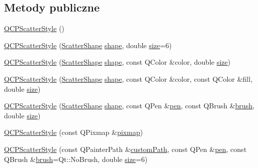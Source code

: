 \subsection*{Metody publiczne}
\begin{DoxyCompactItemize}
\item 
\hyperlink{class_q_c_p_scatter_style_a8836018d9ad83ccd8870de8315c1be73}{Q\+C\+P\+Scatter\+Style} ()
\item 
\hyperlink{class_q_c_p_scatter_style_a003d92f74f4561eda111862eadd62f28}{Q\+C\+P\+Scatter\+Style} (\hyperlink{class_q_c_p_scatter_style_adb31525af6b680e6f1b7472e43859349}{Scatter\+Shape} \hyperlink{class_q_c_p_scatter_style_a4462a25ef17769631f4e0aa81dadca4b}{shape}, double \hyperlink{class_q_c_p_scatter_style_a1973ee650368f1c5f55507b78473f634}{size}=6)
\item 
\hyperlink{class_q_c_p_scatter_style_afa059da858c864c7e05871dc602d7eab}{Q\+C\+P\+Scatter\+Style} (\hyperlink{class_q_c_p_scatter_style_adb31525af6b680e6f1b7472e43859349}{Scatter\+Shape} \hyperlink{class_q_c_p_scatter_style_a4462a25ef17769631f4e0aa81dadca4b}{shape}, const Q\+Color \&color, double \hyperlink{class_q_c_p_scatter_style_a1973ee650368f1c5f55507b78473f634}{size})
\item 
\hyperlink{class_q_c_p_scatter_style_a6e1b64f12cac7f07af180ae4316fd38d}{Q\+C\+P\+Scatter\+Style} (\hyperlink{class_q_c_p_scatter_style_adb31525af6b680e6f1b7472e43859349}{Scatter\+Shape} \hyperlink{class_q_c_p_scatter_style_a4462a25ef17769631f4e0aa81dadca4b}{shape}, const Q\+Color \&color, const Q\+Color \&fill, double \hyperlink{class_q_c_p_scatter_style_a1973ee650368f1c5f55507b78473f634}{size})
\item 
\hyperlink{class_q_c_p_scatter_style_a85acc4941d7e5c9bca5fa51377a77f49}{Q\+C\+P\+Scatter\+Style} (\hyperlink{class_q_c_p_scatter_style_adb31525af6b680e6f1b7472e43859349}{Scatter\+Shape} \hyperlink{class_q_c_p_scatter_style_a4462a25ef17769631f4e0aa81dadca4b}{shape}, const Q\+Pen \&\hyperlink{class_q_c_p_scatter_style_a3c24c3bf37b561b4807aed9f1418ab58}{pen}, const Q\+Brush \&\hyperlink{class_q_c_p_scatter_style_a46bf481d84bfa31b287dd43a3bf86d37}{brush}, double \hyperlink{class_q_c_p_scatter_style_a1973ee650368f1c5f55507b78473f634}{size})
\item 
\hyperlink{class_q_c_p_scatter_style_a63962094587a4c2258435aa7933996cc}{Q\+C\+P\+Scatter\+Style} (const Q\+Pixmap \&\hyperlink{class_q_c_p_scatter_style_a9bab44cc41fcd585621a4b3e0e48231b}{pixmap})
\item 
\hyperlink{class_q_c_p_scatter_style_a879c30647683b3cfbde2afecea815e6f}{Q\+C\+P\+Scatter\+Style} (const Q\+Painter\+Path \&\hyperlink{class_q_c_p_scatter_style_a4dd4998dfb0d6889205668a06c790328}{custom\+Path}, const Q\+Pen \&\hyperlink{class_q_c_p_scatter_style_a3c24c3bf37b561b4807aed9f1418ab58}{pen}, const Q\+Brush \&\hyperlink{class_q_c_p_scatter_style_a46bf481d84bfa31b287dd43a3bf86d37}{brush}=Qt\+::\+No\+Brush, double \hyperlink{class_q_c_p_scatter_style_a1973ee650368f1c5f55507b78473f634}{size}=6)

\end{DoxyCompactItemize}

